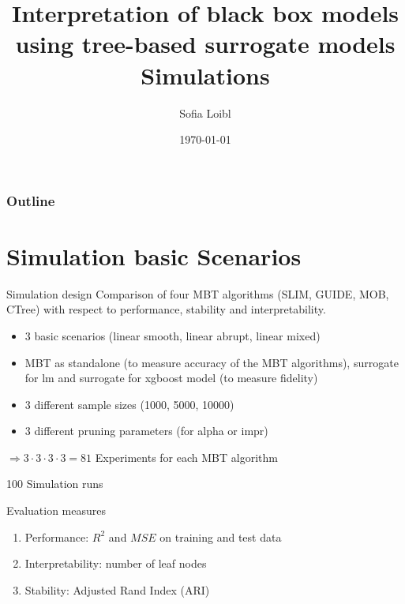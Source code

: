\documentclass[9pt, xcolor=table]{beamer}
\title[Interpretation of black box models]{Interpretation of black box models using tree-based surrogate models \newline \small{Simulations}}
\author[Sofia Loibl]{Sofia Loibl}
\institute[LMU]{LMU München}
\date{\today}
\begin{document}
\begin{frame}
\titlepage 
\end{frame}


\begin{frame}
\frametitle{Outline} 
\tableofcontents 
\end{frame}


\section{Simulation basic Scenarios}
\begin{frame}{Simulation design}
Comparison of four MBT algorithms (SLIM, GUIDE, MOB, CTree)
with respect to performance, stability and interpretability.

\vspace{0.3cm}
\begin{itemize}
    \item 3 basic scenarios (linear smooth, linear abrupt, linear mixed)
    \item MBT as standalone (to measure accuracy of the MBT algorithms), surrogate for lm and surrogate for xgboost model (to measure fidelity)
    \item 3 different sample sizes (1000, 5000, 10000)
    \item 3 different pruning parameters (for alpha or impr)\end{itemize}
    
$\Rightarrow 3 \cdot 3 \cdot 3 \cdot 3 = 81$ Experiments for each MBT algorithm

\vspace{0.3cm}
100 Simulation runs

    
\end{frame}

\begin{frame}{Evaluation measures}
\begin{enumerate}
    \item Performance: $R^2$ and $MSE$ on training and test data
    \item Interpretability: number of leaf nodes
    \item Stability: Adjusted Rand Index (ARI)
\end{enumerate}
    
\end{frame}
\end{document}
